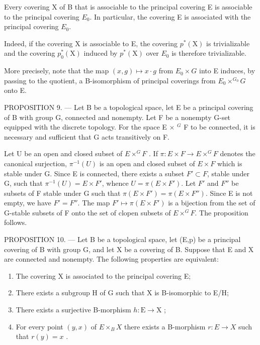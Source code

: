 Every covering X of B that is associable to the principal covering E is associable to the principal covering \(E_{0}\). In particular, the covering E is associated with the principal covering \(E_{0}\).

Indeed, if the covering X is associable to E, the covering \(p^{*}(\mathrm{X})\) is trivializable and the covering \(p_{0}^{*}(\mathrm{X})\) induced by \(p^{*}(\mathrm{X})\) over \(E_{0}\) is therefore trivializable.

More precisely, note that the map \((x,g)\mapsto x\cdot g\) from \(E_{0}\times G\) into E induces, by passing to the quotient, a B-isomorphism of principal coverings from \(E_{0}\times^{G_{0}}G\) onto E.

PROPOSITION 9. --- Let B be a topological space, let E be a principal covering of B with group G, connected and nonempty. Let F be a nonempty G-set equipped with the discrete topology. For the space E × \(^{G}\) F to be connected, it is necessary and sufficient that G acts transitively on F.

Let U be an open and closed subset of \(E \times^{G} F\) . If \(\pi: E \times F \to E \times^{G} F\) denotes the canonical surjection, \(\pi^{-1}(U)\) is an open and closed subset of \(E \times F\) which is stable under G. Since E is connected, there exists a subset \(F' \subset F\), stable under G, such that \(\pi^{-1}(U) = E \times F'\), whence \(U = \pi(E \times F')\). Let \(F'\) and \(F''\) be subsets of F stable under G such that \(\pi(E \times F') = \pi(E \times F'')\). Since E is not empty, we have \(F' = F''\). The map \(F' \mapsto \pi(E \times F')\) is a bijection from the set of G-stable subsets of F onto the set of clopen subsets of \(E \times^{G} F\). The proposition follows.

PROPOSITION 10. --- Let B be a topological space, let (E,p) be a principal covering of B with group G, and let X be a covering of B. Suppose that E and X are connected and nonempty. The following properties are equivalent:

\begin{enumerate}
\def\labelenumi{(\roman{enumi})}
\item
  The covering X is associated to the principal covering E;
\item
  There exists a subgroup H of G such that X is B-isomorphic to E/H;
\item
  There exists a surjective B-morphism \(h: \mathrm{E} \to \mathrm{X}\) ;
\item
  For every point \((y, x)\) of \(E \times_{B} X\) there exists a B-morphism \(r: E \to X\) such that \(r(y) = x\) .
\end{enumerate}


